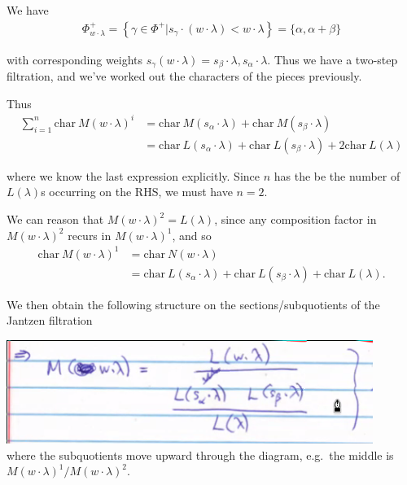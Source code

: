 \documentclass[11pt]{scrartcl}
\theoremstyle{definition}
\theoremstyle{theorem}
\theoremstyle{proof}
\theoremstyle{definition}
\theoremstyle{break}
\theoremstyle{problem}
\newcommand{\ch}[0]{\mathrm{char}~}
\begin{document}
We have \begin{align*}
\Phi_{w\cdot \lambda}^{+}=\left\{\gamma \in \Phi^{+} | s_{\gamma} \cdot(w\cdot \lambda)<w \cdot \lambda\right\}=\{\alpha, \alpha+\beta\}
\end{align*}

with corresponding weights
\(s_\gamma(w\cdot \lambda) = s_\beta \cdot \lambda, s_\alpha \cdot \lambda\).
Thus we have a two-step filtration, and we've worked out the characters
of the pieces previously.

Thus \begin{align*}
\sum_{i=1}^n \ch M(w\cdot \lambda)^i 
&= \ch M(s_\alpha \cdot \lambda) + \ch M(s_\beta \cdot \lambda) \\
&= \ch L(s_\alpha \cdot \lambda) + \ch L(s_\beta \cdot \lambda) + 2\ch L(\lambda)
\end{align*}

where we know the last expression explicitly. Since \(n\) has the be the
number of \(L(\lambda)\)s occurring on the RHS, we must have \(n=2\).

We can reason that \(M(w\cdot \lambda)^2 = L(\lambda)\), since any
composition factor in \(M(w\cdot \lambda)^2\) recurs in
\(M(w\cdot \lambda)^1\), and so \begin{align*}
\ch M(w\cdot \lambda)^1 
&= \ch N(w\cdot \lambda) \\
&= \ch L(s_\alpha \cdot \lambda) + \ch L(s_\beta \cdot \lambda) + \ch L(\lambda)
.\end{align*}

We then obtain the following structure on the sections/subquotients of
the Jantzen filtration

\includegraphics{figures/2020-04-03-09:39.png}\\

where the subquotients move upward through the diagram, e.g.~the middle
is \(M(w\cdot \lambda)^1 / M(w\cdot \lambda)^2\).
\end{document}

